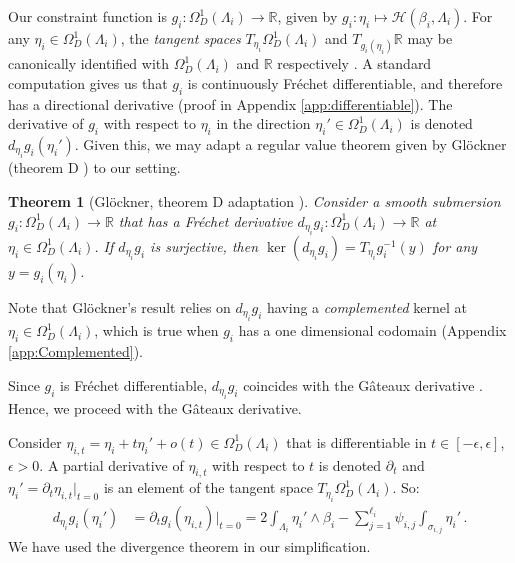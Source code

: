 \documentclass[11pt]{article}
\theoremstyle{plain}
\newtheorem{theorem}{Theorem}[section]
\theoremstyle{definition}
\theoremstyle{remark}
\newcommand{\R}{\mathbb{R}}
\newcommand{\ST}{\Lambda}
\begin{document}
Our constraint function is \(g_i:  \Omega^1_D(\ST_i) \to \R\), given by \(g_i : \eta_i \mapsto \mathscr{H} ( \beta_i, \ST_i) \). For any \(\eta_i \in \Omega^1_D(\ST_i)\), the \textit{tangent spaces} \(T_{\eta_i}  \Omega^1_D(\ST_i) \) and \( T_{g_i(\eta_i)} \R\) may be canonically identified with \( \Omega^1_D(\ST_i) \) and \( \R\) respectively \cite{kriegl1997convenient}. A standard computation gives us that \(g_i\) is continuously Fréchet differentiable, and therefore has a directional derivative (proof in Appendix \ref{app:differentiable}). The derivative of \(g_i\) with respect to \(\eta_i\) in the direction \(\eta_i' \in  \Omega^1_D(\ST_i)\) is denoted \(d_{\eta_i} g_i(\eta_i')\). Given this, we may adapt a regular value theorem given by Gl\"ockner (theorem D \cite{glockner2015fundamentals}) to our setting. 




\begin{theorem}[Gl\"ockner, theorem D adaptation \cite{glockner2015fundamentals}]\label{theorem:Glock}
    Consider a smooth submersion \(g_i : \Omega_D^1(\ST_i) \to \R\) that has a Fr\'echet derivative \(d_{\eta_i} g_i : \Omega_D^1(\ST_i) \to  \R \) at \(\eta_i \in \Omega_D^1(\ST_i)\). If \(d_{\eta_i} g_i\) is surjective, then \(\ker (d_{\eta_i} g_i) = T_{\eta_i} g_i^{-1}(y)\) for any \(y = g_i(\eta_i)\). 
\end{theorem}
Note that Gl\"ockner's result relies on \(d_{\eta_i} g_i\) having a \emph{complemented} kernel at \(\eta_i \in \Omega_D^1(\ST_i)\), which is true when \(g_i\) has a one dimensional codomain \cite{glockner2015fundamentals} (Appendix \ref{app:Complemented}). 




Since \(g_i\) is Fréchet differentiable, \(d_{\eta_i} g_i\) coincides with the Gâteaux derivative \cite{zeidler1986nonlinear}. Hence, we proceed with the Gâteaux derivative.


Consider \(\eta_{i,t} = \eta_i + t \eta_i' + o(t)  \in  \Omega^1_D(\ST_i)\) that is differentiable in \(t \in [-\epsilon, \epsilon]\), \(\epsilon > 0\). A partial derivative of \(\eta_{i,t}\) with respect to \(t\) is denoted \(\partial_t\) and \(\eta_i' = \partial_t \eta_{i,t}|_{t=0}\) is an element of the tangent space \(T_{\eta_i}  \Omega^1_D (\ST_i)\). So:
\begin{align} 
    d_{\eta_i} g_i (\eta_i')  &=  \partial_t g_i (\eta_{i,t}) |_{t=0} 
     \label{eq:deriv}
    = 2  \int_{\ST_i}  \eta_i' \wedge \beta_i 
    -
    \sum_{j=1}^{\ell_i} \psi_{i,j} \int_{\sigma_{i,j}}  \eta_i' \, .
\end{align}
We have used the divergence theorem in our simplification. 
\end{document}

